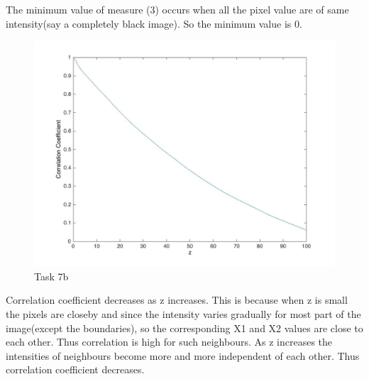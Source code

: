 \documentclass[11pt]{article}
\begin{document}
The minimum value of measure (3) occurs when all the pixel value are of same intensity(say a completely black image). So the minimum value is 0.
\begin{figure}[h]
  \includegraphics[width=\linewidth]{graph2.jpg}
  \caption{Task 7b}
  \label{fig:task7b}
\end{figure}

Correlation coefficient decreases as z increases. This is because when z is small the pixels are closeby and since the intensity varies gradually for most part of the image(except the boundaries), so the corresponding X1 and X2 values are close to each other. Thus correlation is high for such neighbours. As z increases the intensities of neighbours  become more and more independent of each other. Thus correlation coefficient decreases.

\pagebreak
\end{document}
